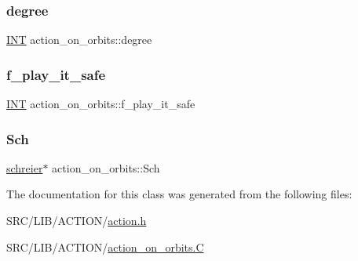 \mbox{\label{classaction__on__orbits_acad649b81d8339bac8926ca7806d1219}} 
\subsubsection{\texorpdfstring{degree}{degree}}
{\footnotesize\ttfamily \mbox{\hyperlink{galois_8h_a09fddde158a3a20bd2dcadb609de11dc}{I\+NT}} action\+\_\+on\+\_\+orbits\+::degree}

\mbox{\label{classaction__on__orbits_a7c1268383dd0a1ee5af6c8890721d8d8}} 
\subsubsection{\texorpdfstring{f\+\_\+play\+\_\+it\+\_\+safe}{f\_play\_it\_safe}}
{\footnotesize\ttfamily \mbox{\hyperlink{galois_8h_a09fddde158a3a20bd2dcadb609de11dc}{I\+NT}} action\+\_\+on\+\_\+orbits\+::f\+\_\+play\+\_\+it\+\_\+safe}

\mbox{\label{classaction__on__orbits_a229383dae1c4102b8ac54df3263677d2}} 
\subsubsection{\texorpdfstring{Sch}{Sch}}
{\footnotesize\ttfamily \mbox{\hyperlink{classschreier}{schreier}}$\ast$ action\+\_\+on\+\_\+orbits\+::\+Sch}



The documentation for this class was generated from the following files\+:\begin{DoxyCompactItemize}
\item 
S\+R\+C/\+L\+I\+B/\+A\+C\+T\+I\+O\+N/\mbox{\hyperlink{action_8h}{action.\+h}}\item 
S\+R\+C/\+L\+I\+B/\+A\+C\+T\+I\+O\+N/\mbox{\hyperlink{action__on__orbits_8_c}{action\+\_\+on\+\_\+orbits.\+C}}\end{DoxyCompactItemize}
